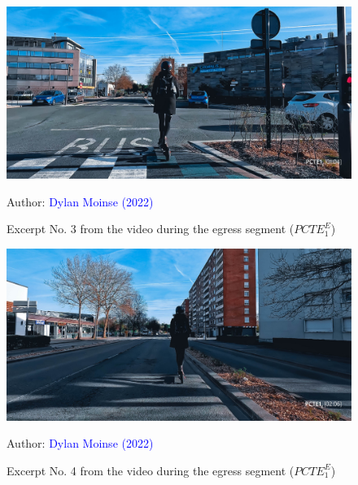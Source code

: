     \begin{figure}[h!]\vspace*{4pt}
        \caption*{Excerpt No. 3 from the video during the egress segment (\(PCTE^{E}_{1}\))}
        \centerline{\includegraphics[width=0.75\columnwidth]{src/Figures/Annexes/Extrait_Video_PCTE1_Egress_3.jpg}}
        \vspace{5pt}
        \begin{flushright}\scriptsize{
        Author: \textcolor{blue}{Dylan Moinse (2022)}
        }\end{flushright}
    \end{figure}

    \begin{figure}[h!]\vspace*{4pt}
        \caption*{Excerpt No. 4 from the video during the egress segment (\(PCTE^{E}_{1}\))}
        \centerline{\includegraphics[width=0.75\columnwidth]{src/Figures/Annexes/Extrait_Video_PCTE1_Egress_4.jpg}}
        \vspace{5pt}
        \begin{flushright}\scriptsize{
        Author: \textcolor{blue}{Dylan Moinse (2022)}
        }\end{flushright}
    \end{figure}

